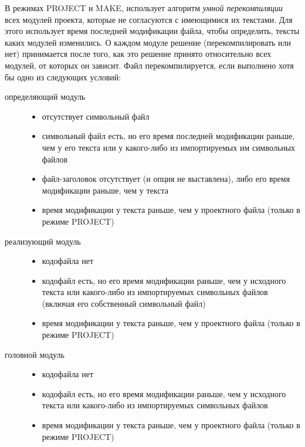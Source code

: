 В режимах PROJECT и MAKE, \xds{} использует алгоритм {\em умной
перекомпиляции} всех модулей проекта, которые не согласуются с 
имеющимися их текстами.
Для этого \xds{} использует время последней модификации файла,
чтобы определить, тексты каких модулей изменились.
О каждом модуле решение (перекомпилировать или нет) принимается
после того, как это решение принято относительно всех модулей,
от которых он зависит. Файл перекомпилируется, если выполнено хотя бы 
одно из следующих условий:
\begin{description}
\item[определяющий модуль] \mbox{}

        \begin{itemize}
        \item отсутствует символьный файл
        \item символьный файл есть, но его время последней
          модификации раньше, чем у его текста или у какого-либо
          из импортируемых им символьных файлов
        \ifgenc
          \item файл-заголовок отсутствует (и опция  
          не выставлена), либо его время модификации раньше, чем у текста
        \fi
\ifcomment
        \item время модификации у текста раньше, чем у проектного файла
         (только в режиме PROJECT)
\fi
        \end{itemize}

\item[реализующий модуль] \mbox{}

        \begin{itemize}
        \item кодофайла нет
        \item кодофайл есть, но его время модификации раньше, чем у
          исходного текста или какого-либо из импортируемых
          символьных файлов (включая его собственный символьный файл)
\ifcomment
        \item время модификации у текста раньше, чем у проектного файла
         (только в режиме PROJECT)
\fi
        \end{itemize}

\item[головной модуль] \mbox{}

        \begin{itemize}
        \item кодофайла нет
        \item кодофайл есть, но его время модификации раньше, чем у
          исходного текста или какого-либо из импортируемых
          символьных файлов
\ifcomment
        \item время модификации у текста раньше, чем у проектного файла
         (только в режиме PROJECT)
\fi
        \end{itemize}


\end{description}
